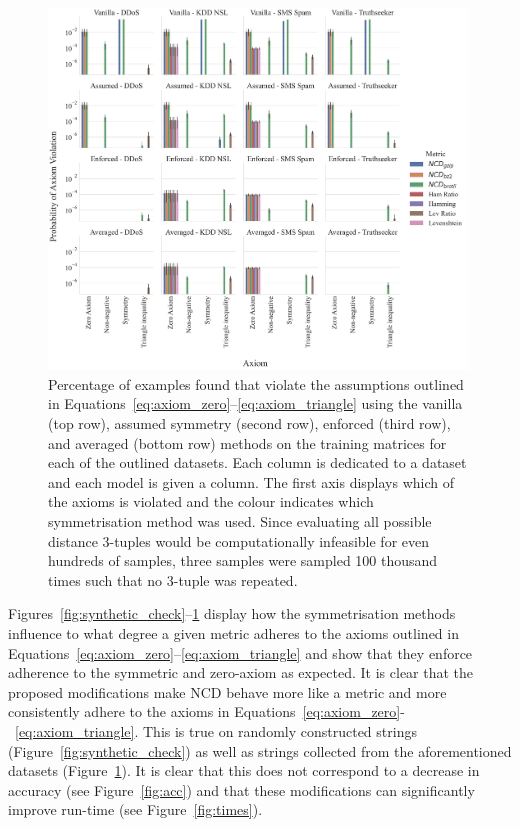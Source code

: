 \documentclass[preprint,12pt]{article}
\begin{document}
\begin{figure}[ht!]
    \centering
    \includegraphics[width=0.99\textwidth]{images/real_world_check.pdf}
    \caption{Percentage of examples found that violate the assumptions outlined in Equations~\ref{eq:axiom_zero}--\ref{eq:axiom_triangle} using the vanilla (top row), assumed symmetry (second row), enforced (third row), and averaged (bottom row) methods on the training matrices for each of the outlined datasets. Each column is dedicated to a dataset and each model is given a column. The first axis displays which of the axioms is violated and the colour indicates which symmetrisation method was used. Since evaluating all possible distance 3-tuples would be computationally infeasible for even hundreds of samples, three samples were sampled  100 thousand times such that no 3-tuple was repeated.
    }
    \label{fig:real_world_check}
\end{figure}

Figures~\ref{fig:synthetic_check}--\ref{fig:real_world_check} display how the symmetrisation methods influence to what degree a given metric adheres to the axioms outlined in Equations~\ref{eq:axiom_zero}--\ref{eq:axiom_triangle} and show that they enforce adherence to the symmetric and zero-axiom as expected.
It is clear that the proposed modifications make NCD behave more like a metric and more consistently adhere to the axioms in Equations~\ref{eq:axiom_zero}-~\ref{eq:axiom_triangle}.
This is true on randomly constructed strings (Figure~\ref{fig:synthetic_check}) as well as strings collected from the aforementioned datasets (Figure~\ref{fig:real_world_check}).
It is clear that this does not correspond to a decrease in accuracy (see Figure~\ref{fig:acc}) and that these modifications can significantly improve run-time (see Figure~\ref{fig:times}).
\end{document}
